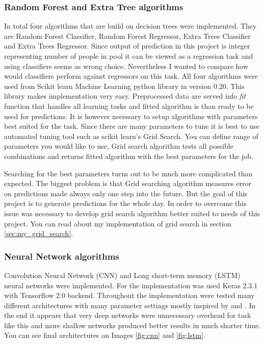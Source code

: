 \documentclass{article}
\begin{document}
\subsubsection{Random Forest and Extra Tree algorithms}
In total four algorithms that are build on decision trees were implemented. They are Random Forest Classifier, Random Forest Regressor, Extra Trees Classifier and Extra Trees Regressor. Since output of prediction in this project is integer representing number of people in pool it can be viewed as a regression task and using classifiers seems as wrong choice. Nevertheless I wanted to compare how would classifiers perform against regressors on this task. All four algorithms were used from Scikit learn Machine Learning python library in version 0.20. This library makes implementation very easy. Preprocessed data are served info \emph{fit} function that handles all learning tasks and fitted algorithm is than ready to be used for predictions. It is however necessary to setup algorithms with parameters best suited for the task. Since there are many parameters to tune it is best to use automated tuning tool such as scikit learn's Grid Search. You can define range of parameters you would like to use, Grid search algorithm tests all possible combinations and returns fitted algorithm with the best parameters for the job. 

Searching for the best parameters turns out to be much more complicated than expected. The biggest problem is that Grid searching algorithm measures error on predictions made always only one step into the future. But the goal of this project is to generate predictions for the whole day. In order to overcome this issue was necessary to develop grid search algorithm better suited to needs of this project. You can read about my implementation of grid search in section \ref{sec:my_grid_search}. 


\subsubsection{Neural Network algorithms} \label{sec:cnn_implementation}
Convolution Neural Network (CNN) and Long short-term memory (LSTM) neural networks were implemented. For the implementation was used Keras 2.3.1 with Tensorflow 2.0 backend. Throughout the implementation were tested many different architectures with many parameter settings mostly inspired by \citep{brownlee2019cnn} and \citep{brownlee2019lstm}. In the end it appears that very deep networks were unnecessary overhead for task like this and more shallow networks produced better results in much shorter time. You can see final architectures on Images \ref{fig:cnn} and \ref{fig:lstm}.
\end{document}
